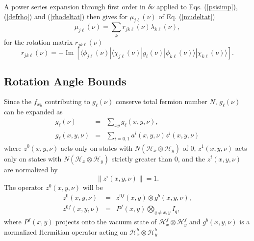 \documentclass[12pt,amsmath,amssymb,onecolumn]{revtex4-2}
\begin{document}
A power series expansion through first order in 
$\delta \nu$ applied to Eqs. (\ref{psisimp}), (\ref{defrho}) and (\ref{rhodeltat})
then gives for $\mu_{j\ell}(\nu)$ of Eq. (\ref{mudeltat})
\begin{equation}
\label{ufromperturb}
\mu_{j\ell}(\nu) = \sum_k r_{jk\ell}(\nu) \lambda_{k\ell}(\nu), 
\end{equation}
for the rotation matrix $r_{jk\ell}(\nu)$
\begin{equation}
\label{rijp}
r_{jk\ell}(\nu) = 
 -\operatorname{Im}[  \langle \phi_{j\ell}(\nu)| \langle \chi_{j\ell}(\nu)|
g_{\ell}(\nu)|\phi_{k\ell}(\nu) \rangle |\chi_{k\ell}(\nu) \rangle ].
\end{equation}



\subsection{\label{subsec:anglebounds} Rotation Angle Bounds}

Since the $f_{xy}$ contributing to $g_\ell(\nu)$
conserve total fermion number $N$,
$g_\ell(\nu)$ can be expanded as
\begin{subequations}
\begin{eqnarray}
\label{expandg}
g_{\ell}(\nu) &=& \sum_{xy} g_{\ell}( x, y, \nu),\\
\label{expandg1}
g_{\ell}(x,y,\nu) &=& \sum_{i = 0,1} a^i(x, y, \nu) z^i(x, y, \nu)
\end{eqnarray}
\end{subequations}
where $z^0( x, y, \nu)$ acts only on states
with $N( \mathcal{H}_x \otimes \mathcal{H}_y)$ of 0,
$z^1( x, y, \nu)$ acts only on states
with $N( \mathcal{H}_x \otimes \mathcal{H}_y)$ strictly greater than 0,
and the $z^i(x,y,\nu)$ are normalized by 
\begin{equation}
\label{normzi}
\parallel z^i(x, y, \nu) \parallel   =  1.
\end{equation}
The operator
$z^0(x, y, \nu)$ will be
\begin{subequations}
\begin{eqnarray}
\label{zprojection}
z^0(x,y,\nu) &=& z^{0f}(x,y) \otimes g^b(x,y,\nu), \\
z^{0f}(x,y,\nu) &=& P^f(x,y) \bigotimes_{q \ne x,y} I_q,
\end{eqnarray}
\end{subequations}
where $P^f(x,y)$ projects onto the vacuum state
of $\mathcal{H}^f_x \otimes \mathcal{H}^f_y$
and $g^b(x,y,\nu)$ is a normalized Hermitian
operator acting on $\mathcal{H}^b_x \otimes \mathcal{H}^b_y$
\end{document}

